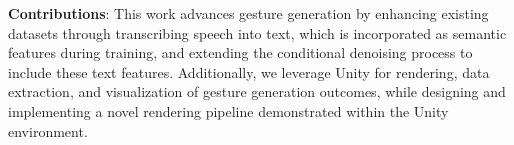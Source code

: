 %	
%	
%	
%	

\textbf{Contributions}: This work advances gesture generation by enhancing existing datasets through transcribing speech into text, which is incorporated as semantic features during training, and extending the conditional denoising process to include these text features. Additionally, we leverage Unity for rendering, data extraction, and visualization of gesture generation outcomes, while designing and implementing a novel rendering pipeline demonstrated within the Unity environment.

%	
%	
%	
%
